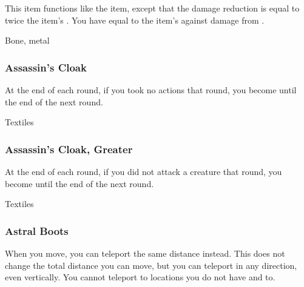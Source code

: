This item functions like the  item, except that the damage reduction is equal to twice the item's .
You have  equal to the item's  against damage from .



 


 Bone, metal


\lowercase{\hypertarget{item:Assassin's Cloak}{}}\label{item:Assassin's Cloak}
\hypertarget{item:Assassin's Cloak}{\subsubsection{Assassin's Cloak\hfill{}}}

At the end of each round, if you took no actions that round, you become  until the end of the next round.



 


 Textiles


\lowercase{\hypertarget{item:Assassin's Cloak, Greater}{}}\label{item:Assassin's Cloak, Greater}
\hypertarget{item:Assassin's Cloak, Greater}{\subsubsection{Assassin's Cloak, Greater\hfill{}}}

At the end of each round, if you did not attack a creature that round, you become  until the end of the next round.



 


 Textiles


\lowercase{\hypertarget{item:Astral Boots}{}}\label{item:Astral Boots}
\hypertarget{item:Astral Boots}{\subsubsection{Astral Boots\hfill{}}}

When you move, you can teleport the same distance instead.
This does not change the total distance you can move, but you can teleport in any direction, even vertically.
You cannot teleport to locations you do not have  and  to.



